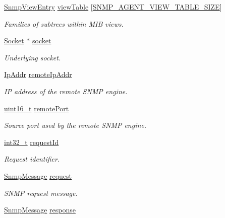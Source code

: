 \begin{DoxyCompactItemize}
\hyperlink{structSnmpViewEntry}{Snmp\+View\+Entry} \hyperlink{struct__SnmpAgentContext_aefb028a572eb6cf2493543805dc75cb6}{view\+Table} \mbox{[}\hyperlink{snmp__agent_8h_a3bd40db59e400b8c4000a718a6da88e1}{S\+N\+M\+P\+\_\+\+A\+G\+E\+N\+T\+\_\+\+V\+I\+E\+W\+\_\+\+T\+A\+B\+L\+E\+\_\+\+S\+I\+ZE}\mbox{]}
\begin{DoxyCompactList}\small\item\em Families of subtrees within M\+IB views. \end{DoxyCompactList}\item 
\hyperlink{socket_8h_aa85acfb0fa336ef495e6ba87fb88fc48}{Socket} $\ast$ \hyperlink{struct__SnmpAgentContext_a969aed21c4b0366b637165bc2a52bcbf}{socket}
\begin{DoxyCompactList}\small\item\em Underlying socket. \end{DoxyCompactList}\item 
\hyperlink{structIpAddr}{Ip\+Addr} \hyperlink{struct__SnmpAgentContext_a466c4deeaf1d486a1c13e3163daf986a}{remote\+Ip\+Addr}
\begin{DoxyCompactList}\small\item\em IP address of the remote S\+N\+MP engine. \end{DoxyCompactList}\item 
\hyperlink{stdint_8h_a273cf69d639a59973b6019625df33e30}{uint16\+\_\+t} \hyperlink{struct__SnmpAgentContext_aeafa1486998773b5f4e1f413ab53371e}{remote\+Port}
\begin{DoxyCompactList}\small\item\em Source port used by the remote S\+N\+MP engine. \end{DoxyCompactList}\item 
\hyperlink{stdint_8h_ab1967d8591af1a4e48c37fd2b0f184d0}{int32\+\_\+t} \hyperlink{struct__SnmpAgentContext_a02553a8b02261e74a5d0ea3310334bf5}{request\+Id}
\begin{DoxyCompactList}\small\item\em Request identifier. \end{DoxyCompactList}\item 
\hyperlink{structSnmpMessage}{Snmp\+Message} \hyperlink{struct__SnmpAgentContext_a7cf8a59f12dae2ba9f25ddf9095eba29}{request}
\begin{DoxyCompactList}\small\item\em S\+N\+MP request message. \end{DoxyCompactList}\item 
\hyperlink{structSnmpMessage}{Snmp\+Message} \hyperlink{struct__SnmpAgentContext_a6a542552834e9f5aeb8095c4fe6520f0}{response}

\end{DoxyCompactItemize}
